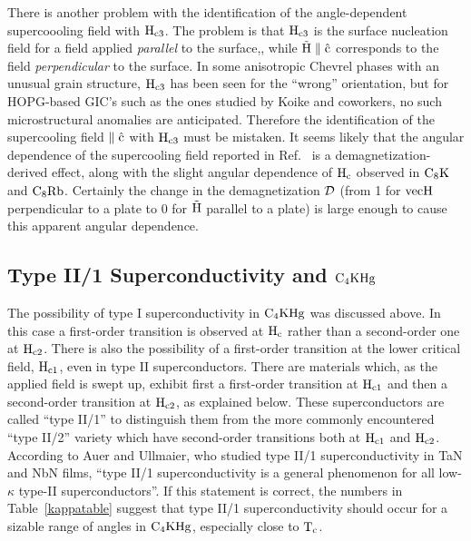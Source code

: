         There   is   another   problem  with   the   identification  of the
angle-dependent supercoooling field with $\rm H_{c3}$.  The problem is that
$\rm H_{c3}$  is the surface  nucleation  field for a field   applied  {\em
parallel} to the surface,\cite{degennes66},  while $\rm  \vec{H}  \parallel
\hat{c}$ corresponds to the field {\em  perpendicular} to the  surface.  In
some anisotropic   Chevrel phases with  an   unusual grain structure,  $\rm
H_{c3}$ has been  seen for the   ``wrong'' orientation, but  for HOPG-based
GIC's   such  as   the ones  studied by   Koike   and coworkers,  no   such
microstructural   anomalies  are   anticipated.\cite{orlando88} Therefore  the
identification of the supercooling field $\rm \parallel
\hat{c}$ with $\rm  H_{c3}$ must be  mistaken.   It seems  likely that  the
angular    dependence     of    the   supercooling     field  reported   in
Ref.~\cite{koike80} is  a demagnetization-derived  effect, along   with the
slight angular dependence of $\rm H_c$ observed in $\rm C_8K$\cite{koike80}
and $\rm   C_8Rb$\cite{kobayashi85a}.    Certainly  the    change   in  the
demagnetization $\cal D$ (from 1 for  $\rm vec{H}$ perpendicular to a plate
to 0 for $\rm \vec{H}$ parallel  to a plate) is large  enough to cause this
apparent angular dependence.\cite{tedrow88,tinkham80}

\subsection{Type II/1 Superconductivity and $\rm C_4KHg $}
\label{typeII/1}

	 The possibility  of type I  superconductivity in  $\rm C_4KHg$ was
discussed above.  In this case a first-order transition is observed at $\rm
H_c$ rather  than a  second-order  one at $\rm H_{c2}$.   There is also the
possibility of  a first-order transition  at the lower critical field, $\rm
H_{c1}$, even in type II  superconductors.\cite{auer73} There are materials
which, as   the applied  field is   swept up, exhibit  first a  first-order
transition  at  $\rm H_{c1}$  and then  a second-order  transition at  $\rm
H_{c2}$,  as explained  below.   These superconductors  are  called  ``type
II/1'' to distinguish them from the more commonly encountered ``type II/2''
variety  which have second-order transitions both  at $\rm H_{c1}$ and $\rm
H_{c2}$.\cite{tinkham80} According to  Auer and Ullmaier, who studied  type
II/1 superconductivity in TaN  and NbN films, ``type II/1 superconductivity
is   a    general      phenomenon     for    all   low-$\kappa$     type-II
superconductors''.\cite{auer73}  If this statement  is correct, the numbers
in  Table~\ref{kappatable} suggest that type II/1  superconductivity should
occur for a  sizable range of angles in  $\rm C_4KHg$, especially  close to
$\rm T_c $.

